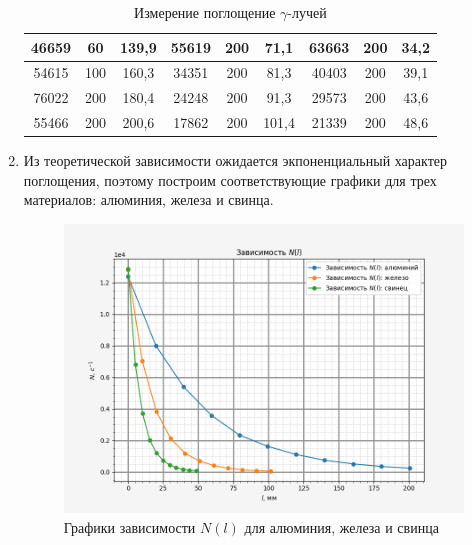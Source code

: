 \begin{enumerate}
\begin{table}[h!]
\begin{tabular}{|ccc|ccc|ccc|}
            \multicolumn{1}{|c|}{46659}  & \multicolumn{1}{c|}{60}     & 139,9      & \multicolumn{1}{c|}{55619}  & \multicolumn{1}{c|}{200}    & 71,1       & \multicolumn{1}{c|}{63663}  & \multicolumn{1}{c|}{200}    & 34,2       \\ \hline
            \multicolumn{1}{|c|}{54615}  & \multicolumn{1}{c|}{100}    & 160,3      & \multicolumn{1}{c|}{34351}  & \multicolumn{1}{c|}{200}    & 81,3       & \multicolumn{1}{c|}{40403}  & \multicolumn{1}{c|}{200}    & 39,1       \\ \hline
            \multicolumn{1}{|c|}{76022}  & \multicolumn{1}{c|}{200}    & 180,4      & \multicolumn{1}{c|}{24248}  & \multicolumn{1}{c|}{200}    & 91,3       & \multicolumn{1}{c|}{29573}  & \multicolumn{1}{c|}{200}    & 43,6       \\ \hline
            \multicolumn{1}{|c|}{55466}  & \multicolumn{1}{c|}{200}    & 200,6      & \multicolumn{1}{c|}{17862}  & \multicolumn{1}{c|}{200}    & 101,4      & \multicolumn{1}{c|}{21339}  & \multicolumn{1}{c|}{200}    & 48,6       \\ \hline
        \end{tabular}
        \caption{Измерение поглощение $\gamma$-лучей}
        \label{absorption}
    \end{table}

    \item Из теоретической зависимости ожидается экпоненциальный характер поглощения, поэтому построим соответствующие графики для трех материалов: алюминия, железа и свинца.
    
    \begin{figure}[h!]
        \centering
        \includegraphics[width = 15 cm]{images/N_l}
        \caption{Графики зависимости $N(l)$ для алюминия, железа и свинца}
        \label{N(l)}
    \end{figure}
    

\end{enumerate}
